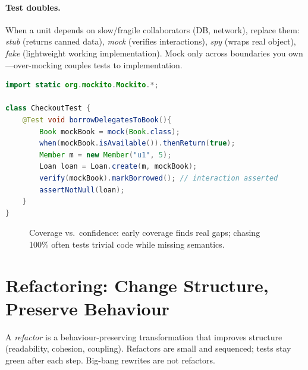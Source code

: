 \paragraph{Test doubles.} When a unit depends on slow/fragile collaborators (DB, network), replace them: \emph{stub} (returns canned data), \emph{mock} (verifies interactions), \emph{spy} (wraps real object), \emph{fake} (lightweight working implementation). Mock only across boundaries you own---over-mocking couples tests to implementation.

\begin{lstlisting}[language=Java, caption={Mocking a collaborator---verify interaction, not just state.}]
import static org.mockito.Mockito.*;

class CheckoutTest {
    @Test void borrowDelegatesToBook(){
        Book mockBook = mock(Book.class);
        when(mockBook.isAvailable()).thenReturn(true);
        Member m = new Member("u1", 5);
        Loan loan = Loan.create(m, mockBook);
        verify(mockBook).markBorrowed(); // interaction asserted
        assertNotNull(loan);
    }
}
\end{lstlisting}

\begin{figure}[h]
\centering
{}
\caption{Coverage vs.\ confidence: early coverage finds real gaps; chasing 100\% often tests trivial code while missing semantics.}
\label{fig:coverage-confidence}
\end{figure}

\section{Refactoring: Change Structure, Preserve Behaviour}
\label{sec:refactoring}
A \emph{refactor} is a behaviour-preserving transformation that improves structure (readability, cohesion, coupling). Refactors are small and sequenced; tests stay green after each step. Big-bang rewrites are not refactors.

